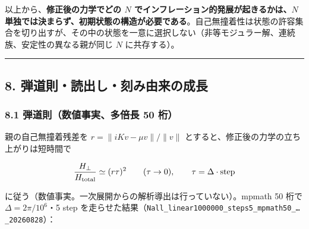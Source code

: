 \documentclass[
  10pt,
  a4paper,
]{ltjsarticle}
\begin{document}
以上から、\textbf{修正後の力学でどの \(N\)
でインフレーション的発展が起きるかは、\(N\)
単独では決まらず、初期状態の構造が必要である}。自己無撞着性は状態の許容集合を切り出すが、その中の状態を一意に選択しない（非等モジュラー解、連続族、安定性の異なる親が同じ
\(N\) に共存する）。

\begin{center}\rule{0.5\linewidth}{0.5pt}\end{center}

\subsection{8.
弾道則・読出し・刻み由来の成長}\label{ux5f3eux9053ux5247ux8aadux51faux3057ux523bux307fux7531ux6765ux306eux6210ux9577}

\subsubsection{8.1 弾道則（数値事実、多倍長 50
桁）}\label{ux5f3eux9053ux5247ux6570ux5024ux4e8bux5b9fux591aux500dux9577-50-ux6841}

親の自己無撞着残差を \(r=\|iKv-\mu v\|/\|v\|\)
とすると、修正後の力学の立ち上がりは短時間で

\[
\frac{H_\perp}{H_{\rm total}}\simeq(r\tau)^2\qquad(\tau\to0),\qquad \tau=\Delta\cdot\text{step}
\]

に従う（数値事実。一次展開からの解析導出は行っていない）。mpmath 50 桁で
\(\Delta=2\pi/10^6\)・5 step
を走らせた結果（\texttt{Nall\_linear1000000\_steps5\_mpmath50\_…\_20260828}）：
\end{document}
